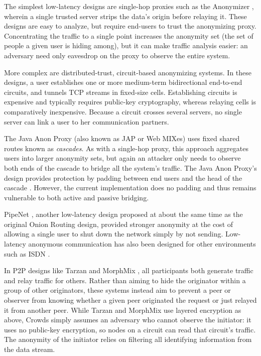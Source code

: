 \documentclass[times,10pt,twocolumn]{article}
\begin{document}
The simplest low-latency designs are single-hop proxies such as the
Anonymizer \cite{anonymizer}, wherein a single trusted server strips the
data's origin before relaying it.  These designs are easy to
analyze, but require end-users to trust the anonymizing proxy. 
Concentrating the traffic to a single point increases the anonymity set
(the set of people a given user is hiding among), but it can make traffic
analysis easier: an adversary need only eavesdrop on the proxy to observe
the entire system.

More complex are distributed-trust, circuit-based anonymizing systems.
In these designs, a user establishes one or more medium-term bidirectional
end-to-end circuits, and tunnels TCP streams in fixed-size cells.
Establishing circuits is expensive and typically requires public-key
cryptography, whereas relaying cells is comparatively inexpensive.
Because a circuit crosses several servers, no single server can link a
user to her communication partners.

The Java Anon Proxy (also known
as JAP or Web MIXes) uses fixed shared routes known as
\emph{cascades}.  As with a single-hop proxy, this approach aggregates
users into larger anonymity sets, but again an attacker only needs to
observe both ends of the cascade to bridge all the system's traffic.
The Java Anon Proxy's design provides protection by padding
between end users and the head of the cascade \cite{web-mix}. However, the
current implementation does no padding and thus remains vulnerable
to both active and passive bridging.

PipeNet \cite{back01, pipenet}, another low-latency design proposed at
about the same time as the original Onion Routing design, provided
stronger anonymity at the cost of allowing a single user to shut
down the network simply by not sending.  Low-latency anonymous
communication has also been designed for other environments such as
ISDN \cite{isdn-mixes}.

In P2P designs like Tarzan \cite{tarzan:ccs02} and MorphMix
\cite{morphmix:fc04}, all participants both generate traffic and relay
traffic for others. Rather than aiming to hide the originator within a
group of other originators, these systems instead aim to prevent a peer
or observer from knowing whether a given peer originated the request
or just relayed it from another peer. While Tarzan and MorphMix use
layered encryption as above, Crowds \cite{crowds-tissec} simply assumes
an adversary who cannot observe the initiator: it uses no public-key
encryption, so nodes on a circuit can read that circuit's traffic. The
anonymity of the initiator relies on filtering all identifying information
from the data stream.
\end{document}
